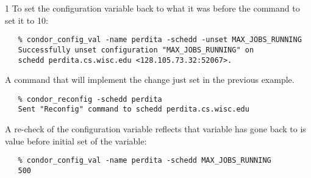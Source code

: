 \begin{ManPage}{\label{man-condor-config-val}}{1}
To set the configuration variable 
back to what it was before the command to set it to 10:
\footnotesize
\begin{verbatim}
   % condor_config_val -name perdita -schedd -unset MAX_JOBS_RUNNING
   Successfully unset configuration "MAX_JOBS_RUNNING" on 
   schedd perdita.cs.wisc.edu <128.105.73.32:52067>.
\end{verbatim}
\normalsize

A command that will implement the change just set in the previous
example.
\footnotesize
\begin{verbatim}
   % condor_reconfig -schedd perdita
   Sent "Reconfig" command to schedd perdita.cs.wisc.edu
\end{verbatim}
\normalsize

A re-check of the configuration variable reflects that variable
has gone back to is value before initial set of the variable:
\footnotesize
\begin{verbatim}
   % condor_config_val -name perdita -schedd MAX_JOBS_RUNNING
   500
\end{verbatim}
\normalsize

\end{ManPage}

